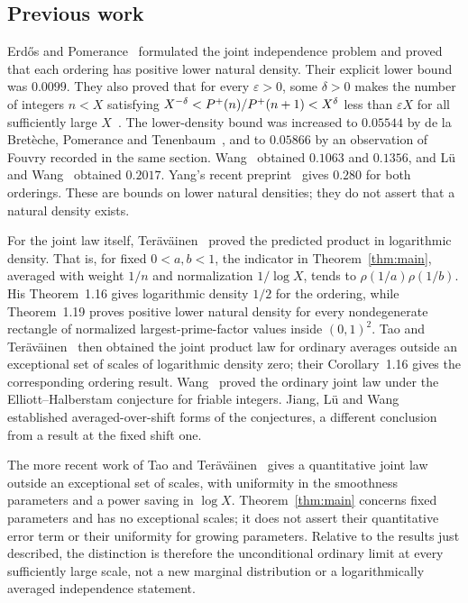 \subsection{Previous work}

Erd\H{o}s and Pomerance~\cite{ErdosPomerance1978} formulated the joint
independence problem and proved that each ordering has positive lower
natural density.  Their explicit lower bound was $0.0099$.  They also
proved that for every $\varepsilon>0$, some $\delta>0$ makes the number of
integers $n<X$ satisfying
$X^{-\delta}<P^+(n)/P^+(n+1)<X^\delta$ less than $\varepsilon X$
for all sufficiently large $X$~\cite[Theorem~1]{ErdosPomerance1978}.
The lower-density bound was increased to $0.05544$ by de la Bret\`eche,
Pomerance and Tenenbaum~\cite[Section~3]{BretechePomeranceTenenbaum2005},
and to $0.05866$ by an observation of Fouvry recorded in the same section.
Wang~\cite{Wang2017,Wang2018} obtained $0.1063$ and $0.1356$, and
L\"u and Wang~\cite{LuWang2025} obtained $0.2017$.
Yang's recent preprint~\cite[Theorem~1.4]{Yang2026} gives $0.280$ for both
orderings.  These are bounds on lower natural densities; they do not
assert that a natural density exists.

For the joint law itself,
Ter\"av\"ainen~\cite[Theorem~1.14]{Teravainen2018} proved the predicted
product in logarithmic density.  That is, for fixed $0<a,b<1$, the
indicator in Theorem~\ref{thm:main}, averaged with weight $1/n$ and
normalization $1/\log X$, tends to $\rho(1/a)\rho(1/b)$.
His Theorem~1.16 gives logarithmic density $1/2$ for the ordering, while
Theorem~1.19 proves positive lower natural density for every nondegenerate
rectangle of normalized largest-prime-factor values inside $(0,1)^2$.
Tao and Ter\"av\"ainen~\cite[Remark~3.3, equation~(50)]{TaoTeravainen2019}
then obtained the joint product law for ordinary averages outside an
exceptional set of scales of logarithmic density zero; their
Corollary~1.16 gives the corresponding ordering result.
Wang~\cite{Wang2021Conditional} proved the ordinary joint law under the
Elliott--Halberstam conjecture for friable integers.  Jiang, L\"u and
Wang~\cite{JiangLuWang2022} established averaged-over-shift forms of the
conjectures, a different conclusion from a result at the fixed shift one.

The more recent work of Tao and
Ter\"av\"ainen~\cite[Theorem~1.8]{TaoTeravainen2026Quantitative} gives
a quantitative joint law outside an exceptional set of scales, with
uniformity in the smoothness parameters and a power saving in $\log X$.
Theorem~\ref{thm:main} concerns fixed parameters and has no exceptional
scales; it does not assert their quantitative error term or their
uniformity for growing parameters.  Relative to the results just
described, the distinction is therefore the unconditional ordinary limit
at every sufficiently large scale, not a new marginal distribution or
a logarithmically averaged independence statement.

